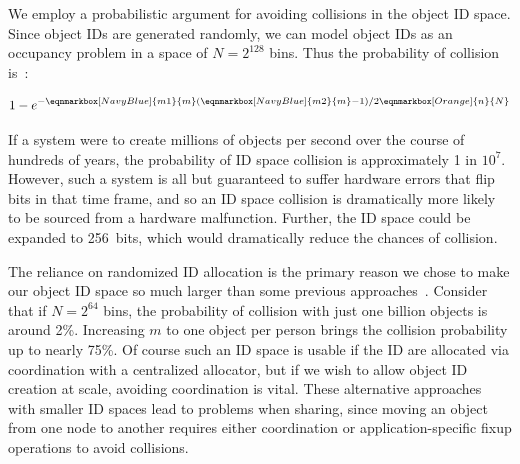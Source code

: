 We employ a probabilistic argument for avoiding collisions in the
object ID space. Since object IDs are generated randomly, we can model object IDs as an occupancy
problem in a space of $N = 2^{128}$ bins. Thus the probability of collision
is~\cite{motwani95}:

\begin{gather*}
    1 - e^{-
            \eqnmarkbox[NavyBlue]{m1}{m}
            (
            \eqnmarkbox[NavyBlue]{m2}{m}
            -1) / 2
            \eqnmarkbox[Orange]{n}{N}
        }
\end{gather*}

If a system were to create millions of objects per second over the course of hundreds of years, the
probability of ID space collision is approximately 1 in $10^{7}$. However, such a system is all but
guaranteed to suffer hardware errors that flip bits in that time frame, and so an ID space collision is dramatically more likely to be
sourced from a hardware malfunction. Further, the ID space
could be expanded to 256~bits, which would dramatically reduce the chances of collision.

The reliance on randomized ID allocation is the primary reason we chose to make our object ID space
so much larger than some previous approaches~\cite{pmdk,pmdk-pointers}. Consider that if $N = 2^{64}$
bins, the probability of collision with just one billion objects is around 2\%. Increasing $m$ to
one object per person brings the collision probability up to nearly 75\%. Of course such an ID space
is usable if the ID are allocated via coordination with a centralized allocator, but if
we wish to allow object ID creation at scale, avoiding coordination is vital. These alternative approaches with smaller ID spaces lead to problems when
sharing, since moving an object from one node to another requires either coordination or application-specific fixup
operations to avoid collisions.

